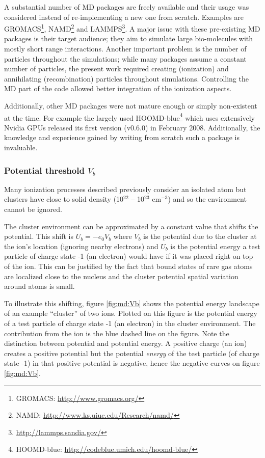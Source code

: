 A substantial number of MD packages are freely available and
their usage was considered instead of re-implementing a new one from scratch.
Examples are GROMACS\footnote{GROMACS:
\url{http://www.gromacs.org/}}, NAMD\footnote{NAMD:
\url{http://www.ks.uiuc.edu/Research/namd/}} and
LAMMPS\footnote{\url{http://lammps.sandia.gov/}}. A major issue with these
pre-existing MD packages is their target audience; they aim to simulate large
bio-molecules with mostly short range interactions. Another important problem
is the number of particles throughout the simulations; while many packages
assume a constant number of particles, the present work required creating
(ionization) and annihilating (recombination) particles throughout simulations.
Controlling the MD part of the code allowed better integration of the
ionization aspects.

Additionally, other MD packages were not mature enough or simply non-existent at the time.
For example the largely used HOOMD-blue\footnote{HOOMD-blue:
\url{http://codeblue.umich.edu/hoomd-blue/}} which uses extensively
Nvidia GPUs released its first version (v0.6.0) in February 2008.
Additionally, the knowledge and experience gained by writing from scratch such
a package is invaluable.


\subsubsection{Potential threshold $V_b$}
\label{section:intro:Vb}

Many ionization processes described previously consider an isolated atom but
clusters have close to solid density (10$^{22}$ -- 10$^{23}$ cm$^{-3}$) and
so the environment cannot be ignored.

The cluster environment can be approximated by a constant value that shifts the
potential\cite{Fennel2007}. This shift is $U_b = -e_0 V_b$ where $V_b$ is the
potential due to the cluster at the ion's location (ignoring nearby electrons)
and $U_b$ is the potential energy a test particle of charge state -1 (an electron)
would have if it was placed right on top of the ion. This can be justified by
the fact that bound states of rare gas atoms are localized close to the nucleus
and the cluster potential spatial variation around atoms is small.

To illustrate this shifting, figure \ref{fig:md:Vb} shows the potential energy
landscape of an example ``cluster'' of two ions. Plotted on this figure is the
potential energy of a test particle of charge state -1 (an electron) in the
cluster environment. The contribution from the ion is the blue dashed line on the
figure. Note the distinction between potential and potential
energy. A positive charge (an ion) creates a positive potential but the
potential \textit{energy} of the test particle (of charge state -1) in that
positive potential is negative, hence the negative curves on figure
\ref{fig:md:Vb}.



